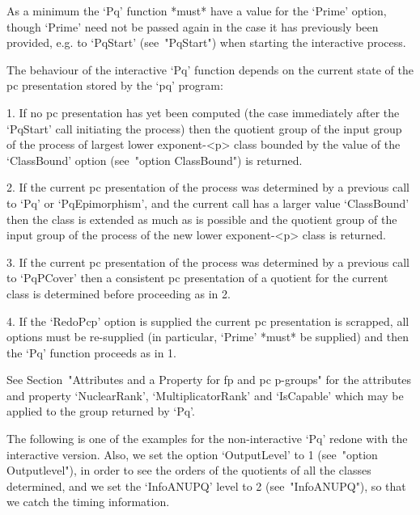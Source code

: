 As a minimum the `Pq' function  *must*  have  a  value  for  the  `Prime'
option, though `Prime' need not be  passed  again  in  the  case  it  has
previously been provided, e.g. to `PqStart' (see~"PqStart") when starting
the interactive process.

The behaviour of the interactive `Pq' function  depends  on  the  current
state of the pc presentation stored by the `pq' program:

\beginlist%

\item{1.}
If no pc presentation has yet been computed (the case  immediately  after
the `PqStart' call initiating the process) then the quotient group of the
input group of the process of largest lower exponent-<p> class bounded by
the  value  of  the  `ClassBound'  option  (see~"option  ClassBound")  is
returned.

\item{2.}
If the current pc  presentation  of  the  process  was  determined  by  a
previous call to `Pq' or `PqEpimorphism', and  the  current  call  has  a
larger value `ClassBound' then the  class  is  extended  as  much  as  is
possible and the quotient group of the input group of the process of  the
new lower exponent-<p> class is returned.

\item{3.}
If the current pc  presentation  of  the  process  was  determined  by  a
previous call to `PqPCover'  then  a  consistent  pc  presentation  of  a
quotient for the current class is determined before proceeding as in 2.

\item{4.}
If the `RedoPcp' option  is  supplied  the  current  pc  presentation  is
scrapped, all options must be re-supplied (in particular, `Prime'  *must*
be supplied) and then the `Pq' function proceeds as in 1.

\endlist

See Section~"Attributes and a Property for fp and pc  p-groups"  for  the
attributes   and   property   `NuclearRank',   `MultiplicatorRank'    and
`IsCapable' which may be applied to the group returned by `Pq'.

The following is one of the examples for the non-interactive `Pq'  redone
with the interactive version. Also, we set the option `OutputLevel' to  1
(see~"option   Outputlevel"), in order to see the orders of the quotients
of all the classes determined, and we set  the  `InfoANUPQ'  level  to  2
(see~"InfoANUPQ"), so that we catch the timing information.

